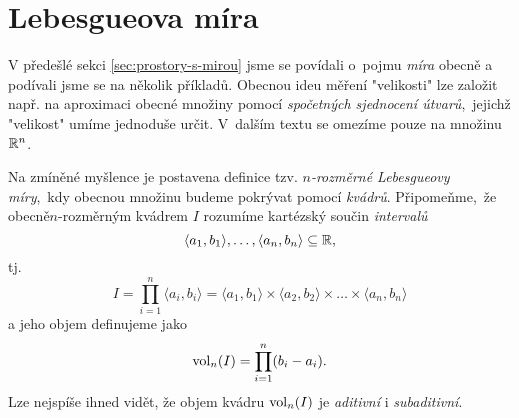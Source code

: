 \section{Lebesgueova míra}\label{sec:lebesgueova-mira}


V předešlé sekci \ref{sec:prostory-s-mirou} jsme se povídali o~pojmu \emph{míra} obecně a podívali jsme se na několik příkladů. Obecnou ideu měření "velikosti" lze založit např. na aproximaci obecné množiny pomocí \emph{spočetných sjednocení útvarů},~jejichž "velikost" umíme jednoduše určit. V~dalším textu se omezíme pouze na množinu $\mathbb{R}^n$.

Na zmíněné myšlence je postavena definice tzv. \emph{$n$-rozměrné Lebesgueovy míry},~kdy obecnou množinu budeme pokrývat pomocí \emph{kvádrů}. Připomeňme,~že obecně\linebreak\mbox{$n$-rozměrným} kvádrem $I$ rozumíme kartézský součin \emph{intervalů}
\[\langle a_1,b_1\rangle,\ldots,\langle a_n,b_n\rangle\subseteq\mathbb{R},\]
tj.
\[I=\prod_{i=1}^{n}\langle a_i,b_i\rangle=\langle a_1,b_1\rangle\times\langle a_2,b_2\rangle\times\dots\times\langle a_n,b_n\rangle\]
a jeho objem definujeme jako
\[\operatorname{vol}_n(I)=\prod_{i=1}^{n}(b_i-a_i).\]
Lze nejspíše ihned vidět, že objem kvádru $\operatorname{vol}_n(I)$ je \emph{aditivní} i \textit{subaditivní}.

